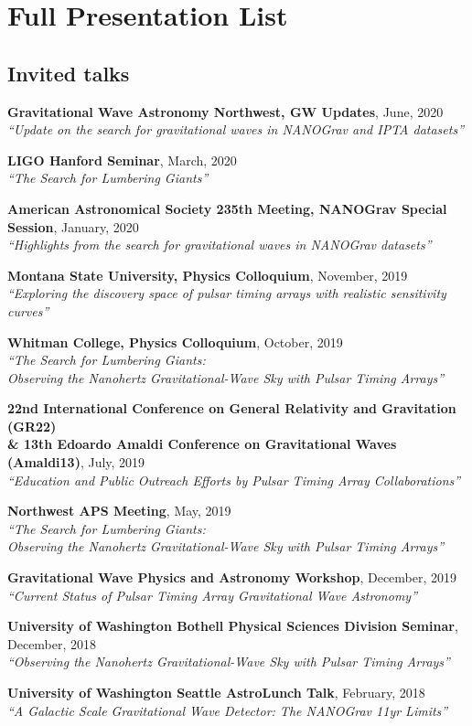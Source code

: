 \documentclass[11pt,letterpaper,sans,unicode]{moderncv}
\newcommand{\invtalkitem}[3]{\item \textbf{#1}, \hfill{#2} \\ \textit{\color{color1}``#3''} \vspace{-0.1cm}} %
\begin{document}
\section{Full Presentation List}
\subsection{Invited talks} %
\renewcommand\labelenumi{\bfseries\theenumi .}

\begin{etaremune}[leftmargin=8mm]
\small
\invtalkitem{Gravitational Wave Astronomy Northwest, GW Updates}{June, 2020}{Update on the search for gravitational waves in NANOGrav and IPTA datasets}
\invtalkitem{LIGO Hanford Seminar}{March, 2020}{The Search for Lumbering Giants}
\invtalkitem{American Astronomical Society 235th Meeting, NANOGrav Special Session}{January, 2020}{Highlights from the search for gravitational waves in NANOGrav datasets}
\invtalkitem{Montana State University, Physics Colloquium}{November, 2019}{Exploring the discovery space of pulsar timing arrays with realistic sensitivity curves}
\invtalkitem{Whitman College, Physics Colloquium}{October, 2019}{The Search for Lumbering Giants:\\ Observing the Nanohertz Gravitational-Wave Sky with Pulsar Timing Arrays}
\invtalkitem{22nd International Conference on General Relativity and Gravitation (GR22)\\ \& 13th Edoardo Amaldi Conference on Gravitational Waves (Amaldi13)}{July, 2019}{Education and Public Outreach Efforts by Pulsar Timing Array Collaborations}
\invtalkitem{Northwest APS Meeting}{May, 2019}{The Search for Lumbering Giants:\\Observing the Nanohertz Gravitational-Wave Sky with Pulsar Timing Arrays}
\invtalkitem{Gravitational Wave Physics and Astronomy Workshop}{December, 2019}{Current Status of Pulsar Timing Array Gravitational Wave Astronomy}
\invtalkitem{University of Washington Bothell Physical Sciences Division Seminar}{December, 2018}{Observing the Nanohertz Gravitational-Wave Sky with Pulsar Timing Arrays}
\invtalkitem{University of Washington Seattle AstroLunch Talk}{February, 2018}{A Galactic Scale Gravitational Wave Detector: The NANOGrav 11yr Limits}


\end{etaremune}
\end{document}
